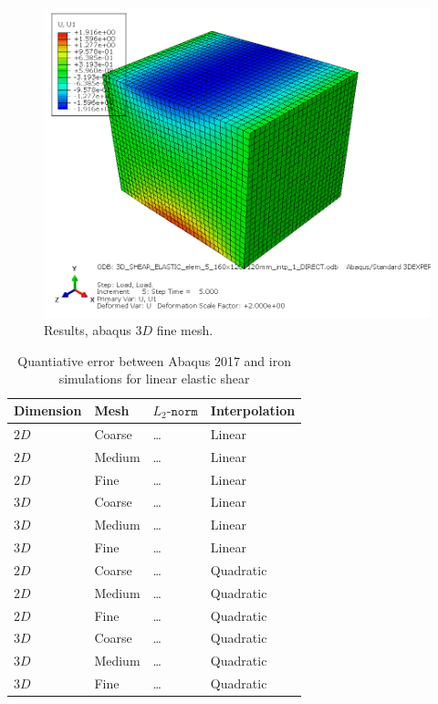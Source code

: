\begin{figure}[h!]
    \centering 
    \includegraphics[width=\columnwidth]{examples/example-0102/doc/figures/3D_SHEAR_ELASTIC_elem_5_160x120x120mm_intp_1_DIRECTU1.png} 
    \caption{Results, abaqus $3D$ fine mesh.}
    \label{example-0102-abaqus-3D-fig}
\end{figure}
%
\begin{table}
	\centering
    \begin{tabular}{llll}
    Dimension & Mesh 		& $L_2\texttt{-norm}$			& Interpolation \\ \hline
    $2D$      & Coarse 	& \ldots									& Linear \\
    $2D$      & Medium  & \ldots									& Linear \\
    $2D$      & Fine  	& \ldots									& Linear \\
    $3D$      & Coarse  & \ldots									& Linear \\
    $3D$      & Medium  & \ldots									& Linear \\
		$3D$			&	Fine 		&	\ldots									& Linear \\
    $2D$      & Coarse 	& \ldots									& Quadratic \\
    $2D$      & Medium  & \ldots									& Quadratic \\
    $2D$      & Fine  	& \ldots									& Quadratic \\
    $3D$      & Coarse  & \ldots									& Quadratic \\
    $3D$      & Medium  & \ldots									& Quadratic \\
		$3D$			&	Fine 		&	\ldots									& Quadratic \\				
    \end{tabular}
		\caption{Quantiative error between Abaqus 2017 and iron simulations for linear elastic shear}
		\label{tab:example-0102-valid-Iron-Abaqus}
\end{table}
